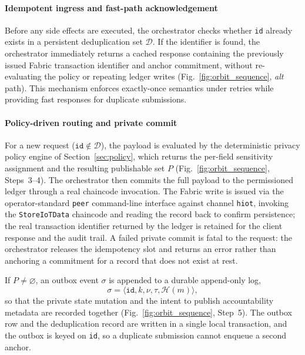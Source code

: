 \documentclass[final,5p,times,twocolumn]{elsarticle}
\begin{document}
\paragraph*{\textbf{Idempotent ingress and fast-path acknowledgement}}
Before any side effects are executed, the orchestrator checks whether \texttt{id} already exists in a persistent deduplication set $\mathcal{D}$. If the identifier is found, the orchestrator immediately returns a cached response containing the previously issued Fabric transaction identifier and anchor commitment, without re-evaluating the policy or repeating ledger writes (Fig.~\ref{fig:orbit_sequence}, \textit{alt} path). This mechanism enforces exactly-once semantics under retries while providing fast responses for duplicate submissions.

\paragraph*{\textbf{Policy-driven routing and private commit}}
For a new request ($\texttt{id}\notin\mathcal{D}$), the payload is evaluated by the deterministic privacy policy engine of Section~\ref{sec:policy}, which returns the per-field sensitivity assignment and the resulting publishable set $P$ (Fig.~\ref{fig:orbit_sequence}, Steps~3--4). The orchestrator then commits the full payload to the permissioned ledger through a real chaincode invocation. The Fabric write is issued via the operator-standard \texttt{peer} command-line interface against channel \texttt{hiot}, invoking the \texttt{StoreIoTData} chaincode and reading the record back to confirm persistence; the real transaction identifier returned by the ledger is retained for the client response and the audit trail. A failed private commit is fatal to the request: the orchestrator releases the idempotency slot and returns an error rather than anchoring a commitment for a record that does not exist at rest.

If $P\neq\varnothing$, an outbox event $\sigma$ is appended to a durable append-only log,
\begin{equation}
  \sigma=\langle \texttt{id}, k, \nu, \tau, \mathcal{H}(m)\rangle,
  \label{eq:sigma}
\end{equation}
so that the private state mutation and the intent to publish accountability metadata are recorded together (Fig.~\ref{fig:orbit_sequence}, Step~5). The outbox row and the deduplication record are written in a single local transaction, and the outbox is keyed on \texttt{id}, so a duplicate submission cannot enqueue a second anchor.
\end{document}
